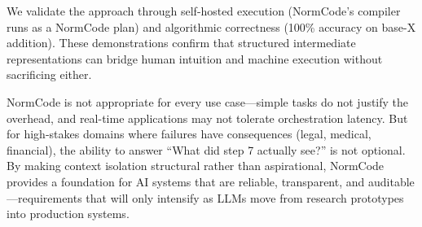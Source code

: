 We validate the approach through self-hosted execution (NormCode's compiler runs as a NormCode plan) and algorithmic correctness (100\% accuracy on base-X addition). These demonstrations confirm that structured intermediate representations can bridge human intuition and machine execution without sacrificing either.

NormCode is not appropriate for every use case---simple tasks do not justify the overhead, and real-time applications may not tolerate orchestration latency. But for high-stakes domains where failures have consequences (legal, medical, financial), the ability to answer ``What did step 7 actually see?'' is not optional. By making context isolation structural rather than aspirational, NormCode provides a foundation for AI systems that are reliable, transparent, and auditable---requirements that will only intensify as LLMs move from research prototypes into production systems.

